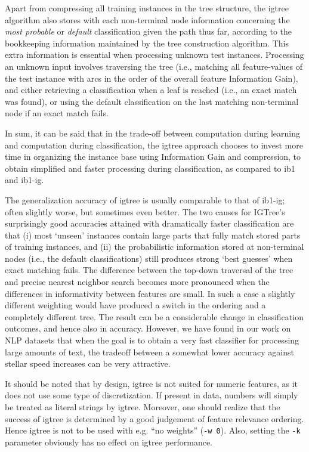 \documentclass{report}
\begin{document}
Apart from compressing all training instances in the tree structure,
the {\sc igtree} algorithm also stores with each non-terminal node
information concerning the {\em most probable} or {\em default}
classification given the path thus far, according to the bookkeeping
information maintained by the tree construction algorithm. This extra
information is essential when processing unknown test instances.
Processing an unknown input involves traversing the tree (i.e.,
matching all feature-values of the test instance with arcs in the
order of the overall feature Information Gain), and either retrieving
a classification when a leaf is reached (i.e., an exact match was
found), or using the default classification on the last matching
non-terminal node if an exact match fails.

In sum, it can be said that in the trade-off between computation
during learning and computation during classification, the {\sc
igtree} approach chooses to invest more time in organizing the
instance base using Information Gain and compression, to obtain
simplified and faster processing during classification,
as compared to {\sc ib1} and {\sc ib1-ig}.

The generalization accuracy of {\sc igtree} is usually comparable to
that of {\sc ib1-ig}; often slightly worse, but sometimes even better.
The two causes for {\sc IGTree}'s surprisingly good accuracies
attained with dramatically faster classification are that (i) most
`unseen' instances contain large parts that fully match stored parts
of training instances, and (ii) the probabilistic information stored
at non-terminal nodes (i.e., the default classifications) still
produces strong `best guesses' when exact matching fails. The
difference between the top-down traversal of the tree and precise
nearest neighbor search becomes more pronounced when the differences
in informativity between features are small. In such a case a slightly
different weighting would have produced a switch in the ordering and a
completely different tree. The result can be a considerable change in
classification outcomes, and hence also in accuracy. However, we have
found in our work on NLP datasets that when the goal is to obtain a
very fast classifier for processing large amounts of text, the
tradeoff between a somewhat lower accuracy against stellar speed
increases can be very attractive.

It should be noted that by design, {\sc igtree} is not suited for
numeric features, as it does not use some type of discretization. If
present in data, numbers will simply be treated as literal strings by
{\sc igtree}. Moreover, one should realize that the success of {\sc
  igtree} is determined by a good judgement of feature relevance
ordering. Hence {\sc igtree} is not to be used with e.g. ``no
weights'' ({\tt -w 0}). Also, setting the {\tt -k} parameter obviously
has no effect on {\sc igtree} performance.
\end{document}
